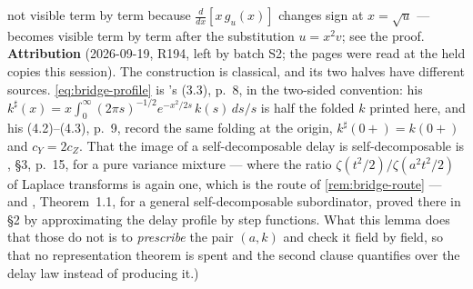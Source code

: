 \begin{lemma}
{not visible term by term because $\frac{d}{dx}[x\,g_u(x)]$ changes sign at $x = \sqrt u$ ---
becomes visible term by term after the substitution $u = x^2v$; see the proof.
\textbf{Attribution} (2026-09-19, R194, left by batch S2; the pages were read at the held copies
this session). The construction is classical, and its two halves have different sources.
\ref{eq:bridge-profile} is 's (3.3), p.~8, in the two-sided
convention: his $k^{\sharp}(x) = x\int_0^\infty(2\pi s)^{-1/2}e^{-x^2/2s}\,k(s)\,ds/s$ is half the
folded $k$ printed here, and his (4.2)--(4.3), p.~9, record the same folding at the origin,
$k^{\sharp}(0{+}) = k(0{+})$ and $c_Y = 2c_Z$. That the image of a self-decomposable delay is
self-decomposable is , \S3, p.~15, for a pure variance mixture --- where
the ratio $\zeta(t^2/2)/\zeta(a^2t^2/2)$ of Laplace transforms is again one, which is the route of
\ref{rem:bridge-route} --- and , Theorem~1.1, for a general
self-decomposable subordinator, proved there in \S2 by approximating the delay profile by step
functions. What this lemma does that those do not is to \emph{prescribe} the pair $(a,k)$ and
check it field by field, so that no representation theorem is spent and the second clause
quantifies over the delay law instead of producing it.)}
\end{lemma}

